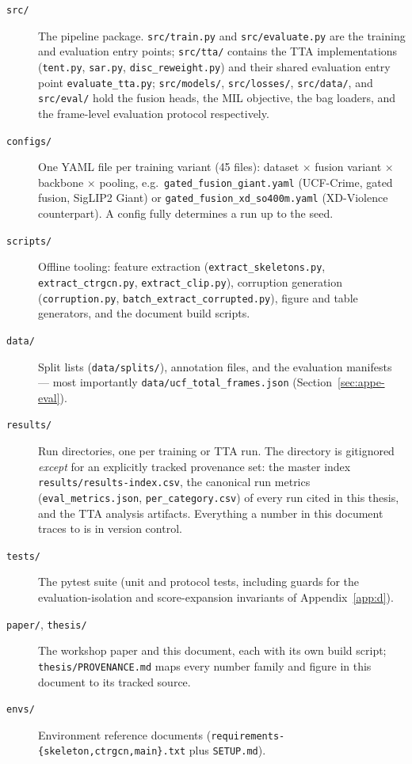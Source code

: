 \begin{description}
    \item[\texttt{src/}] The pipeline package. \texttt{src/train.py} and
    \texttt{src/evaluate.py} are the training and evaluation entry points;
    \texttt{src/tta/} contains the TTA implementations
    (\texttt{tent.py}, \texttt{sar.py}, \texttt{disc\_reweight.py}) and their
    shared evaluation entry point \texttt{evaluate\_tta.py};
    \texttt{src/models/}, \texttt{src/losses/}, \texttt{src/data/}, and
    \texttt{src/eval/} hold the fusion heads, the MIL objective, the bag
    loaders, and the frame-level evaluation protocol respectively.
    \item[\texttt{configs/}] One YAML file per training variant (45 files):
    dataset $\times$ fusion variant $\times$ backbone $\times$ pooling, e.g.\
    \texttt{gated\_fusion\_giant.yaml} (UCF-Crime, gated fusion, SigLIP2
    Giant) or \texttt{gated\_fusion\_xd\_so400m.yaml} (XD-Violence
    counterpart). A config fully determines a run up to the seed.
    \item[\texttt{scripts/}] Offline tooling: feature extraction
    (\texttt{extract\_skeletons.py}, \texttt{extract\_ctrgcn.py},
    \texttt{extract\_clip.py}), corruption generation
    (\texttt{corruption.py}, \texttt{batch\_extract\_corrupted.py}), figure
    and table generators, and the document build scripts.
    \item[\texttt{data/}] Split lists (\texttt{data/splits/}), annotation
    files, and the evaluation manifests --- most importantly
    \texttt{data/ucf\_total\_frames.json} (Section~\ref{sec:appe-eval}).
    \item[\texttt{results/}] Run directories, one per training or TTA run.
    The directory is gitignored \emph{except} for an explicitly tracked
    provenance set: the master index \texttt{results/results-index.csv}, the
    canonical run metrics (\texttt{eval\_metrics.json},
    \texttt{per\_category.csv}) of every run cited in this thesis, and the
    TTA analysis artifacts. Everything a number in this document traces to is
    in version control.
    \item[\texttt{tests/}] The pytest suite (unit and protocol tests,
    including guards for the evaluation-isolation and score-expansion
    invariants of Appendix~\ref{app:d}).
    \item[\texttt{paper/}, \texttt{thesis/}] The workshop paper and this
    document, each with its own build script;
    \texttt{thesis/PROVENANCE.md} maps every number family and figure in
    this document to its tracked source.
    \item[\texttt{envs/}] Environment reference documents
    (\texttt{requirements-\{skeleton,ctrgcn,main\}.txt} plus
    \texttt{SETUP.md}).
\end{description}

